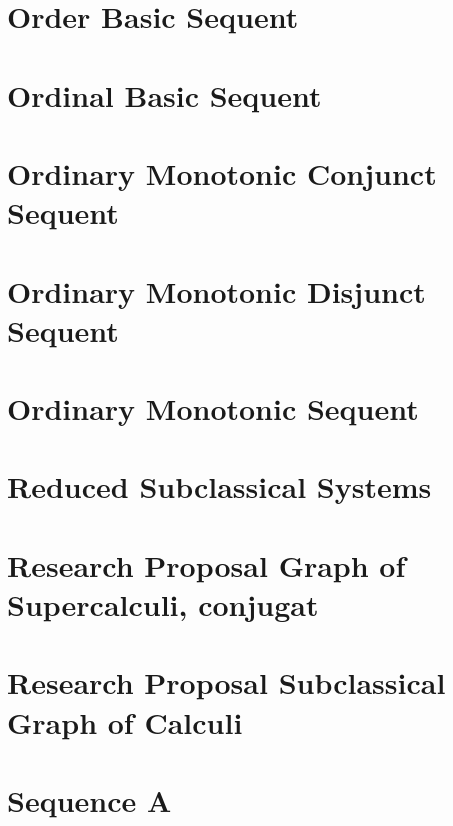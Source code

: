 \documentclass{report}
\begin{document}
\chapter{Order Basic Sequent}


\chapter{Ordinal Basic Sequent}


\chapter{Ordinary Monotonic Conjunct Sequent}


\chapter{Ordinary Monotonic Disjunct Sequent}


\chapter{Ordinary Monotonic Sequent}


\chapter{Reduced Subclassical Systems}


\chapter{Research Proposal Graph of Supercalculi, conjugat}


\chapter{Research Proposal Subclassical Graph of Calculi}


\chapter{Sequence A}

\end{document}
